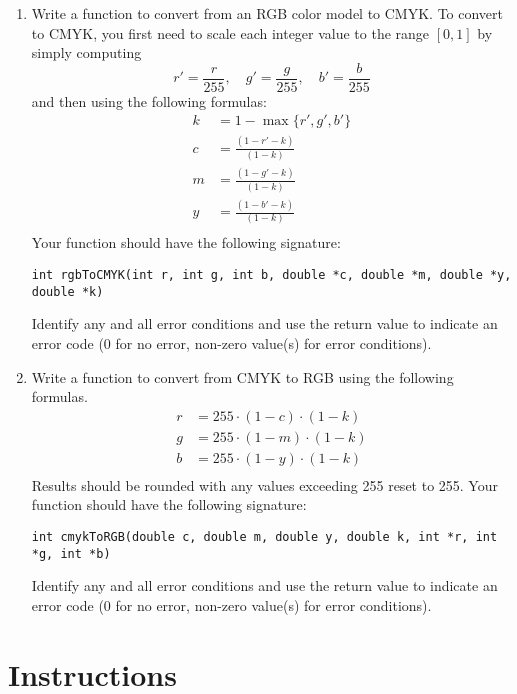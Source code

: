 \documentclass[12pt]{scrartcl}
\begin{document}
\begin{enumerate}
\item Write a function to convert from an RGB color model to CMYK.  To 
convert to CMYK, you first need to scale each integer value to the range 
$[0, 1]$ by simply computing
	$$r' = \frac{r}{255}, \quad g' = \frac{g}{255}, \quad b' = \frac{b}{255}$$
	and then using the following formulas:
\begin{align*}
k & = 1-\max\{r', g', b'\} \\
c & = \frac{(1-r'-k)}{(1-k)} \\
m & = \frac{(1-g'-k)}{(1-k)} \\
y & = \frac{(1-b'-k)}{(1-k)} \\
\end{align*}
Your function should have the following signature:

\texttt{int rgbToCMYK(int r, int g, int b, double *c, double *m, double *y, double *k)}

Identify any and all error conditions and use the return value to indicate
an error code (0 for no error, non-zero value(s) for error conditions).

\item Write a function to convert from CMYK to RGB using the following formulas.
\begin{align*}
r & = 255 \cdot (1 - c) \cdot (1-k) \\
g & = 255 \cdot (1 - m) \cdot (1-k) \\
b & = 255 \cdot (1 - y) \cdot (1-k) \\
\end{align*}
Results should be rounded with any values exceeding 255 reset to 255.
Your function should have the following signature:

\texttt{int cmykToRGB(double c, double m, double y, double k, int *r, int *g, int *b)}

Identify any and all error conditions and use the return value to indicate
an error code (0 for no error, non-zero value(s) for error conditions).

\end{enumerate}



\section*{Instructions}
\end{document}
